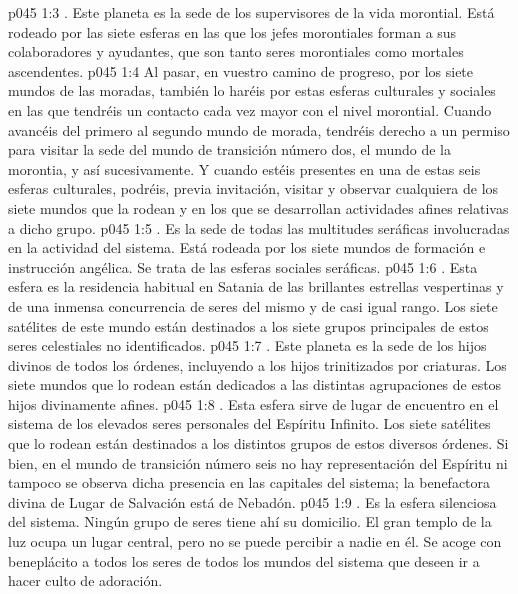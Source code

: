 \vs p045 1:3 \pc {}. Este planeta es la sede de los supervisores de la vida morontial. Está rodeado por las siete esferas en las que los jefes morontiales forman a sus colaboradores y ayudantes, que son tanto seres morontiales como mortales ascendentes.
\vs p045 1:4 Al pasar, en vuestro camino de progreso, por los siete mundos de las moradas, también lo haréis por estas esferas culturales y sociales en las que tendréis un contacto cada vez mayor con el nivel morontial. Cuando avancéis del primero al segundo mundo de morada, tendréis derecho a un permiso para visitar la sede del mundo de transición número dos, el mundo de la morontia, y así sucesivamente. Y cuando estéis presentes en una de estas seis esferas culturales, podréis, previa invitación, visitar y observar cualquiera de los siete mundos que la rodean y en los que se desarrollan actividades afines relativas a dicho grupo.
\vs p045 1:5 \pc {}. Es la sede de todas las multitudes seráficas involucradas en la actividad del sistema. Está rodeada por los siete mundos de formación e instrucción angélica. Se trata de las esferas sociales seráficas.
\vs p045 1:6 \pc {}. Esta esfera es la residencia habitual en Satania de las brillantes estrellas vespertinas y de una inmensa concurrencia de seres del mismo y de casi igual rango. Los siete satélites de este mundo están destinados a los siete grupos principales de estos seres celestiales no identificados.
\vs p045 1:7 \pc {}. Este planeta es la sede de los hijos divinos de todos los órdenes, incluyendo a los hijos trinitizados por criaturas. Los siete mundos que lo rodean están dedicados a las distintas agrupaciones de estos hijos divinamente afines.
\vs p045 1:8 \pc {}. Esta esfera sirve de lugar de encuentro en el sistema de los elevados seres personales del Espíritu Infinito. Los siete satélites que lo rodean están destinados a los distintos grupos de estos diversos órdenes. Si bien, en el mundo de transición número seis no hay representación del Espíritu ni tampoco se observa dicha presencia en las capitales del sistema; la benefactora divina de Lugar de Salvación está  de Nebadón.
\vs p045 1:9 \pc {}. Es la esfera silenciosa del sistema. Ningún grupo de seres tiene ahí su domicilio. El gran templo de la luz ocupa un lugar central, pero no se puede percibir a nadie en él. Se acoge con beneplácito a todos los seres de todos los mundos del sistema que deseen ir a hacer culto de adoración.
